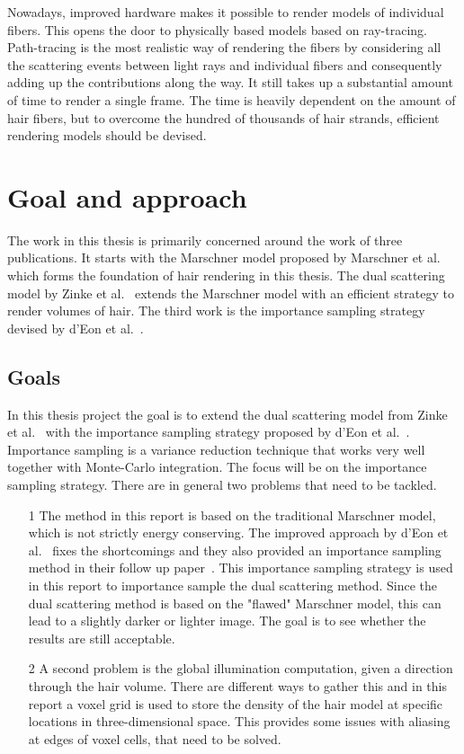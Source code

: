 \documentclass[11pt,a4paper]{report}
\begin{document}
Nowadays, improved hardware makes it possible to render models of individual fibers. This opens the door to physically based models based on ray-tracing. Path-tracing is the most realistic way of rendering the fibers by considering all the scattering events between light rays and individual fibers and consequently adding up the contributions along the way. It still takes up a substantial amount of time to render a single frame. The time is heavily dependent on the amount of hair fibers, but to overcome the hundred of thousands of hair strands, efficient rendering models should be devised.


\section{Goal and approach}

The work in this thesis is primarily concerned around the work of three publications. It starts with the Marschner model proposed by Marschner et al.~\cite{marschner} which forms the foundation of hair rendering in this thesis. The dual scattering model by Zinke et al.~\cite{zinke} extends the Marschner model with an efficient strategy to render volumes of hair. The third work is the importance sampling strategy devised by d'Eon et al.~\cite{eon2013}.

\subsection*{Goals}
In this thesis project the goal is to extend the dual scattering model from Zinke et al.~\cite{zinke} with the importance sampling strategy proposed by d'Eon et al.~\cite{eon2013}. Importance sampling is a variance reduction technique that works very well together with Monte-Carlo integration. The focus will be on the importance sampling strategy. There are in general two problems that need to be tackled.

\begin{itemize}

\item[1] The method in this report is based on the traditional Marschner model, which is not strictly energy conserving. The improved approach by d'Eon et al.~\cite{eon2011} fixes the shortcomings and they also provided an importance sampling method in their follow up paper~\cite{eon2013}. This importance sampling strategy is used in this report to importance sample the dual scattering method. Since the dual scattering method is based on the "flawed" Marschner model, this can lead to a slightly darker or lighter image. The goal is to see whether the results are still acceptable.

\item[2] A second problem is the global illumination computation, given a direction through the hair volume. There are different ways to gather this and in this report a  voxel grid is used to store the density of the hair model at specific locations in three-dimensional space. This provides some issues with aliasing at edges of voxel cells, that need to be solved.

\end{itemize}
\end{document}
